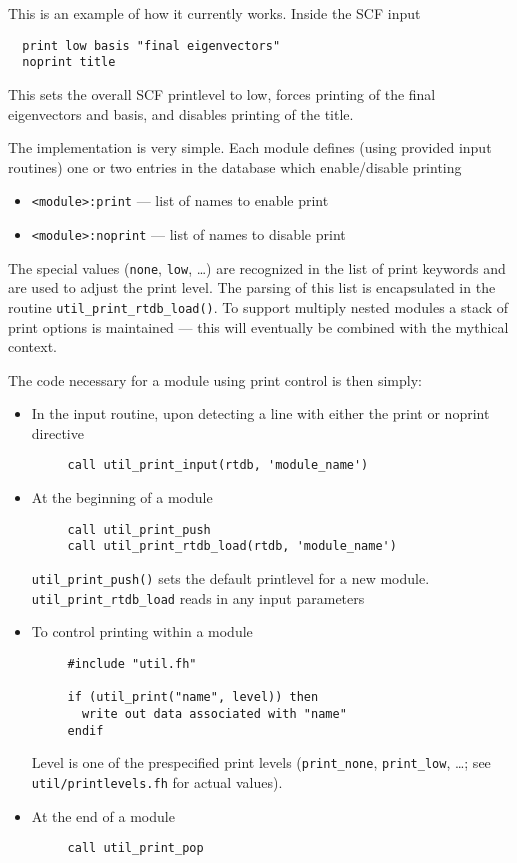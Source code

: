 This is an example of how it currently works. Inside the SCF input
\begin{verbatim}
  print low basis "final eigenvectors"
  noprint title
\end{verbatim}
This sets the overall SCF printlevel to low, forces printing of the
final eigenvectors and basis, and disables printing of the title.

The implementation is very simple.  Each module defines (using
provided input routines) one or two entries in the database which
enable/disable printing
\begin{itemize}
\item \verb+<module>:print+ --- list of names to enable print
\item \verb+<module>:noprint+ --- list of names to disable print
\end{itemize}
The special values ({\tt none}, {\tt low}, \ldots) are recognized in
the list of print keywords and are used to adjust the print level.
The parsing of this list is encapsulated in the routine
\verb+util_print_rtdb_load()+.  To support multiply nested modules a
stack of print options is maintained --- this will eventually be
combined with the mythical context.

\sloppy
The code necessary for a module using print control is then simply:
\begin{itemize}
\item In the input routine, upon detecting a line with either the print
  or noprint directive
\begin{verbatim}
     call util_print_input(rtdb, 'module_name')
\end{verbatim}
\item At the beginning of a module
\begin{verbatim}
     call util_print_push 
     call util_print_rtdb_load(rtdb, 'module_name')
\end{verbatim}
  \verb+util_print_push()+ sets the default printlevel for a new
  module. \verb+util_print_rtdb_load+ reads in any input parameters
\item To control printing within a module
\begin{verbatim}
     #include "util.fh"

     if (util_print("name", level)) then
       write out data associated with "name"
     endif
\end{verbatim}
  Level is one of the prespecified print levels (\verb+print_none+,
  \verb+print_low+, \ldots; see \verb+util/printlevels.fh+ for
  actual values).
\item At the end of a module
\begin{verbatim}
     call util_print_pop
\end{verbatim}
\end{itemize}

